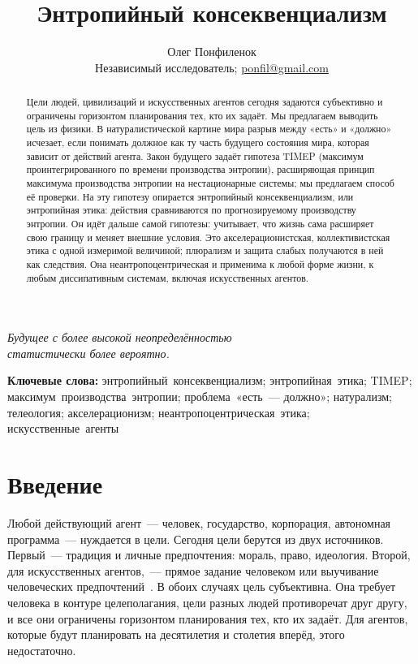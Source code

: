\documentclass[11pt,a4paper]{article}
\title{\textbf{Энтропийный консеквенциализм}}
\author{%
  Олег Понфиленок\\[0.35em]%
  {\normalsize Независимый исследователь; \href{mailto:ponfil@gmail.com}{ponfil@gmail.com}}%
}
\date{}
\begin{document}
\pagecolor{black}
\color{fg}

\maketitle

\begin{flushright}
\emph{Будущее с более высокой неопределённостью\\ статистически более вероятно.}
\end{flushright}
\vspace{0.5em}

\begin{abstract}
Цели людей, цивилизаций и искусственных агентов сегодня задаются субъективно и ограничены горизонтом планирования тех, кто их задаёт. Мы предлагаем выводить цель из физики. В натуралистической картине мира разрыв между «есть» и «должно» исчезает, если понимать должное как ту часть будущего состояния мира, которая зависит от действий агента. Закон будущего задаёт гипотеза TIMEP (максимум проинтегрированного по времени производства энтропии), расширяющая принцип максимума производства энтропии на нестационарные системы; мы предлагаем способ её проверки. На эту гипотезу опирается энтропийный консеквенциализм, или энтропийная этика: действия сравниваются по прогнозируемому производству энтропии. Он идёт дальше самой гипотезы: учитывает, что жизнь сама расширяет свою границу и меняет внешние условия. Это акселерационистская, коллективистская этика с одной измеримой величиной; плюрализм и защита слабых получаются в ней как следствия. Она неантропоцентрическая и применима к любой форме жизни, к любым диссипативным системам, включая искусственных агентов.
\end{abstract}

\noindent\textbf{Ключевые слова:} энтропийный~консеквенциализм; энтропийная~этика; TIMEP; максимум~производства~энтропии; проблема~«есть~--- должно»; натурализм; телеология; акселерационизм; неантропоцентрическая~этика; искусственные~агенты

\section{Введение}\label{sec:intro}

Любой действующий агент~--- человек, государство, корпорация, автономная программа~--- нуждается в цели. Сегодня цели берутся из двух источников. Первый~--- традиция и личные предпочтения: мораль, право, идеология. Второй, для искусственных агентов,~--- прямое задание человеком или выучивание человеческих предпочтений~\cite{russell2019,hadfield2016}. В обоих случаях цель субъективна. Она требует человека в контуре целеполагания, цели разных людей противоречат друг другу, и все они ограничены горизонтом планирования тех, кто их задаёт. Для агентов, которые будут планировать на десятилетия и столетия вперёд, этого недостаточно.
\end{document}
